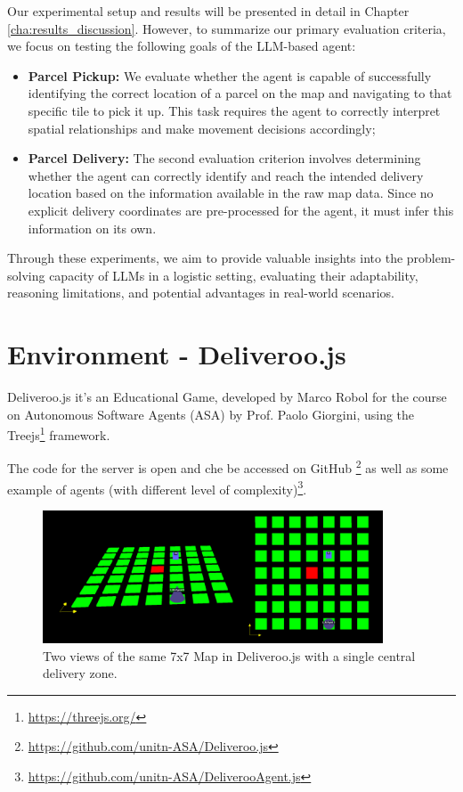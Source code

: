 Our experimental setup and results will be presented in detail in Chapter \ref{cha:results_discussion}.
However, to summarize our primary evaluation criteria, we focus on testing the
following goals of the LLM-based agent:

\begin{itemize}
  \item \textbf{Parcel Pickup:} We evaluate whether the agent is capable of
    successfully identifying the correct location of a parcel on the map and
    navigating to that specific tile to pick it up. This task requires the agent
    to correctly interpret spatial relationships and make movement decisions accordingly;

  \item \textbf{Parcel Delivery:} The second evaluation criterion involves
    determining whether the agent can correctly identify and reach the intended
    delivery location based on the information available in the raw map data. Since
    no explicit delivery coordinates are pre-processed for the agent, it must
    infer this information on its own.
\end{itemize}

Through these experiments, we aim to provide valuable insights into the problem-solving
capacity of LLMs in a logistic setting, evaluating their adaptability, reasoning
limitations, and potential advantages in real-world scenarios.

\section{Environment - Deliveroo.js}
\label{sec:environment_deliveroo_js}

Deliveroo.js it's an Educational Game, developed by Marco Robol for the course on
Autonomous Software Agents (ASA) by Prof. Paolo Giorgini, using the Treejs\footnote{\url{https://threejs.org/}}
framework.

The code for the server is open and che be accessed on GitHub \footnote{\url{https://github.com/unitn-ASA/Deliveroo.js}}
as well as some example of agents (with different level of complexity)\footnote{\url{https://github.com/unitn-ASA/DeliverooAgent.js}}.

\begin{figure}[h!]
  \centering
  \includegraphics[width=0.90\textwidth]{images/deliveroo_js.png}
  \caption{Two views of the same 7x7 Map in Deliveroo.js with a single central
  delivery zone.}
  \label{fig:deliveroo_js}
\end{figure}

